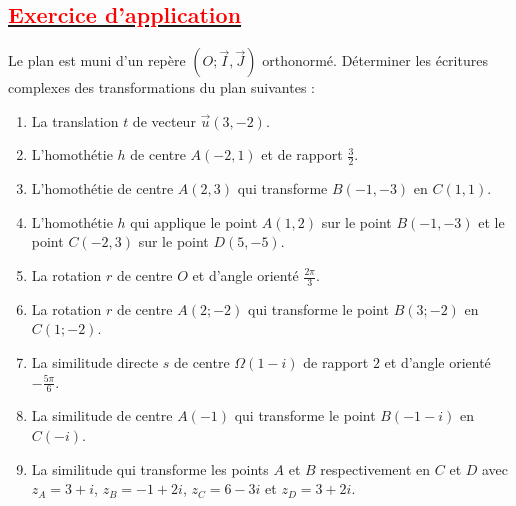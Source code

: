 \documentclass[12pt]{article}
\begin{document}
\subsection*{\underline{\textbf{\textcolor{red}{Exercice d’application}}}}
Le plan est muni d’un repère $(O; \vec{I}, \vec{J})$ orthonormé. Déterminer les écritures complexes des transformations du plan suivantes :
\begin{enumerate}
    \item La translation $t$ de vecteur $\overrightarrow{u}(3, -2)$.
    \item L’homothétie $h$ de centre $A(-2, 1)$ et de rapport $\frac{3}{2}$.
    \item L’homothétie de centre $A(2, 3)$ qui transforme $B(-1, -3)$ en $C(1, 1)$.
    \item L’homothétie $h$ qui applique le point $A(1, 2)$ sur le point $B(-1, -3)$ et le point $C(-2, 3)$ sur le point $D(5, -5)$.
    \item La rotation $r$ de centre $O$ et d’angle orienté $\frac{2\pi}{3}$.
    \item La rotation $r$ de centre $A(2; -2)$ qui transforme le point $B(3; -2)$ en $C(1; -2)$.
    \item La similitude directe $s$ de centre $\Omega(1 - i)$ de rapport $2$ et d’angle orienté $-\frac{5\pi}{6}$.
    \item La similitude de centre $A(-1)$ qui transforme le point $B(-1 - i)$ en $C(-i)$.
    \item La similitude qui transforme les points $A$ et $B$ respectivement en $C$ et $D$ avec $z_A = 3 + i$, $z_B = -1 + 2i$, $z_C = 6 - 3i$ et $z_D = 3 + 2i$.
\end{enumerate}
\end{document}
